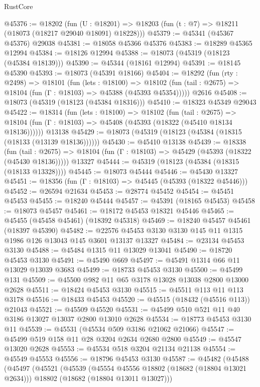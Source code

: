 \begin{lexlean}{RustCore}
\begin{coremodule}
@45376 := @18202
    (fun (U : @18201) => @18203 (fun (t : @7) => @18211 (@18073 (@18217 @29040 @18091) @18228)))
@45379 := @45341 (@45367 @45376) @29038
@45381 := @18058 @45366 @45376
@45383 := @18289 @45365 @12994
@45384 := @18126 @12994
@45388 := @18073 (@45319 (@18123 (@45384 @18139)))
@45390 := @45344 (@18161 @12994)
@45391 := @18145 @45390
@45393 := @18073 (@45391 @18166)
@45404 := @18292
    (fun (rty : @2498) =>
    @18101
      (fun (lets : @18100) =>
      @18102 (fun (tail : @2675) => @18104 (fun (Γ : @18103) => @45388 (@45393 @45354)))))
    @2616
@45408 := @18073 (@45319 (@18123 (@45384 @18316)))
@45410 := @18323 @45349 @29043
@45422 := @18314
    (fun (lets : @18100) =>
    @18102
      (fun (tail : @2675) =>
      @18104 (fun (Γ : @18103) => @45408 (@45393 (@18322 (@45410 @18134 @18136))))))
    @13138
@45429 := @18073 (@45319 (@18123 (@45384 (@18315 (@18133 (@13139 @18136))))))
@45430 := @45410 @13138
@45439 := @18338
    (fun (tail : @2675) => @18104 (fun (Γ : @18103) => @45429 (@45393 (@18322 (@45430 @18136)))))
    @13327
@45444 := @45319 (@18123 (@45384 (@18315 (@18133 @13328))))
@45445 := @18073 @45444
@45446 := @45430 @13327
@45451 := @18356 (fun (Γ : @18103) => @45445 (@45393 (@18322 @45446)))
@45452 := @26594 @21634
@45453 := @28774 @45452
@45454 := @45451 @45453
@45455 := @18240 @45444
@45457 := @45391 (@18165 @45453)
@45458 := @18073 @45457
@45461 := @18172 @45453 @18321 @45446
@45465 := @45455 (@45458 @45461) (@18392 @45318)
@45469 := @18240 @45457 @45461 (@18397 @45390)
@45482 := @22576 @45453 @3130 @3130 @145 @11 @1315 @1986 @126 @13043 @145 @3601 @13137 @13327
@45484 := @23134 @45453 @3130
@45488 := @45484 @1315 @11 @13029 @13041
@45490 := @18720 @45453 @3130
@45491 := @45490 @669
@45497 := @45491 @1314 @66 @11 @13029 @13039 @3683
@45499 := @18733 @45453 @3130
@45500 := @45499 @131
@45509 := @45500 @982 @11 @65 @3178 @13028 @13038 @2800 @13000 @2628
@45511 := @18424 @45453 @3130
@45515 := @45511 @113 @11 @113 @3178
@45516 := @18433 @45453
@45520 := @45515 (@18432 (@45516 @113)) @21043
@45521 := @45509 @45520
@45531 := @45499 @510 @521 @11 @40 @3186 @13027 @13037 @2800 @13010 @2628
@45534 := @18773 @45453 @3130 @11
@45539 := @45531 (@45534 @509 @3186 @21062 @21066)
@45547 := @45499 @519 @158 @11 @28 @3204 @2634 @2680 @2800
@45549 := @45547 @13020 @2628
@45553 := @45534 @518 @3204 @21134 @21138
@45554 := @45549 @45553
@45556 := @18796 @45453 @3130
@45587 := @45482
    (@45488
      (@45497
        (@45521
          (@45539
            (@45554 @45556 @18802 (@18682 (@18804 @13021 @2634)))
            @18802
            (@18682 (@18804 @13011 @13027)))

\end{coremodule}
\end{lexlean}
